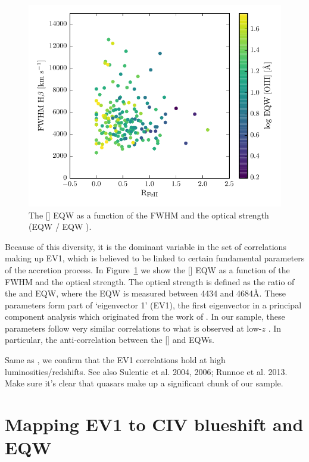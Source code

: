 \begin{figure}
    \includegraphics[width=\columnwidth]{figures/chapter04/ev1.pdf} 
    \caption{The [] EQW as a function of the \hb FWHM and the optical  strength (EQW / EQW \hb).}     
    \label{fig:ev1}
\end{figure}

Because of this diversity, it is the dominant variable in the set of correlations making up EV1, which is believed to be linked to certain fundamental parameters of the accretion process. 
In Figure~\ref{fig:ev1} we show the [] EQW as a function of the \hb FWHM and the optical  strength. 
The optical  strength is defined as the ratio of the  and \hb EQW, where the  EQW is measured between 4434 and 4684\AA.
These parameters form part of `eigenvector 1' (EV1), the first eigenvector in a principal component analysis which originated from the work of \citet{boroson92}.
In our sample, these parameters follow very similar correlations to what is observed at low-$z$ \citep[e.g.][]{shen14}.
In particular, the anti-correlation between the [] and  EQWs.  

Same as \citet{shen16a}, we confirm that the EV1 correlations hold at high luminosities/redshifts. 
See also Sulentic et al. 2004, 2006; Runnoe et al. 2013. 
Make sure it's clear that \citet{shen16a} quasars make up a significant chunk of our sample. 

\section{Mapping EV1 to CIV blueshift and EQW}


